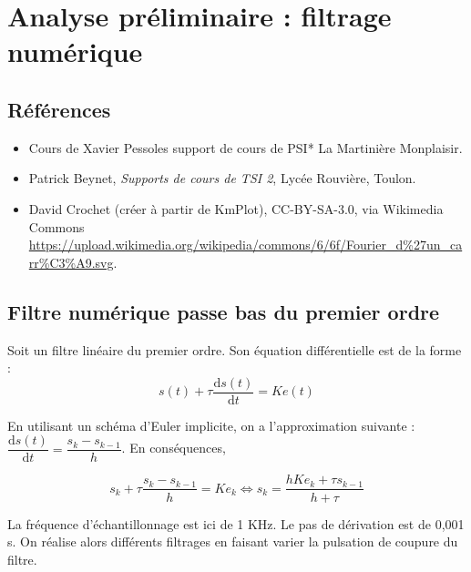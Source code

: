 \section{Analyse préliminaire : filtrage numérique}

\subsection{Références} 
\begin{itemize}
\item Cours de Xavier Pessoles support de cours de  PSI* La Martinière Monplaisir.
\item Patrick Beynet, \textit{Supports de cours de TSI 2}, Lycée Rouvière, Toulon.
\item David Crochet (créer à partir de KmPlot), CC-BY-SA-3.0, via Wikimedia Commons \url{https://upload.wikimedia.org/wikipedia/commons/6/6f/Fourier_d\%27un_carr\%C3\%A9.svg}.
\end{itemize}


\subsection{Filtre numérique passe bas du premier ordre}
Soit un filtre linéaire du premier ordre. Son équation différentielle est de la forme :
$$
s(t)+\tau \dfrac{\text{d} s(t) }{\text{d}t} = K e(t)
$$

En utilisant un schéma d'Euler implicite, on a l'approximation suivante : $\dfrac{\text{d} s(t) }{\text{d}t} = \dfrac{s_{k}-s_{k-1}}{h}$. En conséquences, 

$$
s_k+\tau \dfrac{s_{k}-s_{k-1}}{h} = K e_k \Leftrightarrow 
s_k = \dfrac{h K e_k+\tau s_{k-1}}{h+\tau}
$$

La fréquence d'échantillonnage est ici de 1 KHz. Le pas de dérivation est de 0,001 s. On réalise alors différents filtrages en faisant varier la pulsation de coupure du filtre. 

%

